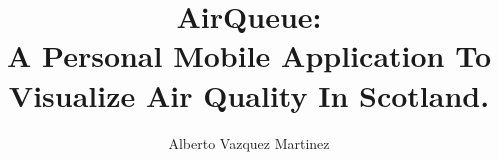 \documentclass[bsc,logo, abbrevs]{infthesis}
\title{AirQueue: \protect\\ A Personal Mobile Application To Visualize Air Quality In Scotland.}
\author{Alberto Vazquez Martinez}
\begin{document}
\begin{preliminary}

\maketitle

\standarddeclaration
\dedication{Acknowledgements}
\tableofcontents
\listoffigures
\iffalse
\listoftables
\begin{accron}\end{accron}
\fi
\end{preliminary}












\end{document}
